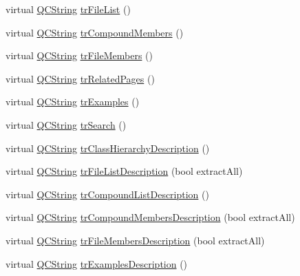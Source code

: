 \begin{DoxyCompactItemize}
virtual \mbox{\hyperlink{class_q_c_string}{Q\+C\+String}} \mbox{\hyperlink{class_translator_vietnamese_af61fca05266b5000476826685e828c25}{tr\+File\+List}} ()
\item 
virtual \mbox{\hyperlink{class_q_c_string}{Q\+C\+String}} \mbox{\hyperlink{class_translator_vietnamese_a5067963c9fce9876ee22efa663260450}{tr\+Compound\+Members}} ()
\item 
virtual \mbox{\hyperlink{class_q_c_string}{Q\+C\+String}} \mbox{\hyperlink{class_translator_vietnamese_a0fc11ed8307e843a66a5b348dc6e6428}{tr\+File\+Members}} ()
\item 
virtual \mbox{\hyperlink{class_q_c_string}{Q\+C\+String}} \mbox{\hyperlink{class_translator_vietnamese_a5315c11d80b67d7295871062c0f1381a}{tr\+Related\+Pages}} ()
\item 
virtual \mbox{\hyperlink{class_q_c_string}{Q\+C\+String}} \mbox{\hyperlink{class_translator_vietnamese_aec70e499c88c890ad2c06092d5faa4d3}{tr\+Examples}} ()
\item 
virtual \mbox{\hyperlink{class_q_c_string}{Q\+C\+String}} \mbox{\hyperlink{class_translator_vietnamese_a6da142bb9d430f99f2507772f814d235}{tr\+Search}} ()
\item 
virtual \mbox{\hyperlink{class_q_c_string}{Q\+C\+String}} \mbox{\hyperlink{class_translator_vietnamese_a2baec0ed85d8c1da81f98c808389e86f}{tr\+Class\+Hierarchy\+Description}} ()
\item 
virtual \mbox{\hyperlink{class_q_c_string}{Q\+C\+String}} \mbox{\hyperlink{class_translator_vietnamese_a8405dd413217211cfae85f4b467a106f}{tr\+File\+List\+Description}} (bool extract\+All)
\item 
virtual \mbox{\hyperlink{class_q_c_string}{Q\+C\+String}} \mbox{\hyperlink{class_translator_vietnamese_a717ba281f39200ddaafbdc960d9be0e4}{tr\+Compound\+List\+Description}} ()
\item 
virtual \mbox{\hyperlink{class_q_c_string}{Q\+C\+String}} \mbox{\hyperlink{class_translator_vietnamese_a5a72f77efcbb97bd51de7622140e0173}{tr\+Compound\+Members\+Description}} (bool extract\+All)
\item 
virtual \mbox{\hyperlink{class_q_c_string}{Q\+C\+String}} \mbox{\hyperlink{class_translator_vietnamese_a653e6b26b384ab0c82a2d6f4ed022c92}{tr\+File\+Members\+Description}} (bool extract\+All)
\item 
virtual \mbox{\hyperlink{class_q_c_string}{Q\+C\+String}} \mbox{\hyperlink{class_translator_vietnamese_aff6b91ca8b47558aa4f9aed938d3297c}{tr\+Examples\+Description}} ()
\item 

\end{DoxyCompactItemize}
